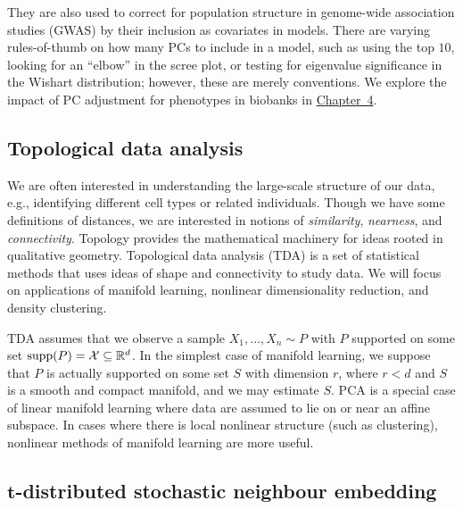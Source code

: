 They are also used to correct for population structure in genome-wide association studies (GWAS) by their inclusion as covariates in models\cite{price_principal_2006}. There are varying rules-of-thumb on how many PCs to include in a model, such as using the top $10$, looking for an ``elbow'' in the scree plot, or testing for eigenvalue significance in the Wishart distribution; however, these are merely conventions. We explore the impact of PC adjustment for phenotypes in biobanks in \hyperref[chap:chapter4]{Chapter~4}. 

\subsection{Topological data analysis}

We are often interested in understanding the large-scale structure of our data, e.g., identifying different cell types or related individuals. Though we have some definitions of distances, we are interested in notions of \textit{similarity}, \textit{nearness}, and \textit{connectivity}. Topology provides the mathematical machinery for ideas rooted in qualitative geometry\citep{carlsson_topology_2009}. Topological data analysis (TDA) is a set of statistical methods that uses ideas of shape and connectivity to study data\citep{wasserman_topological_2018}. We will focus on applications of manifold learning, nonlinear dimensionality reduction, and density clustering.

TDA assumes that we observe a sample $X_1, \dots, X_n \sim P$ with $P$ supported on some set $\operatorname{supp}(P) = \mathcal{X} \subseteq \mathbb{R}^d$. 
In the simplest case of manifold learning, we suppose that $P$ is actually supported on some set $S$ with dimension $r$, where $r < d$ and $S$ is a smooth and compact manifold, and we may estimate $S$. PCA is a special case of linear manifold learning where data are assumed to lie on or near an affine subspace\citep{wasserman_topological_2018}. In cases where there is local nonlinear structure (such as clustering), nonlinear methods of manifold learning are more useful\cite{izenman_introduction_2012}.

\subsection{\texorpdfstring{$\mathbf{t}$}{f}-distributed stochastic neighbour embedding}

